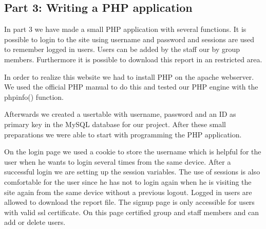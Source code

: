 \subsection {Part 3: Writing a PHP application}


\noindent
In part 3 we have made a small PHP application with several functions. It is possible to login to the site using username and password and sessions are used to remember logged in users. Users can be added by the staff our by group members. Furthermore it is possible to download this report in an restricted area. \newline

\noindent
In order to realize this website we had to install PHP on the apache webserver. We used the official PHP manual to do this \cite{phpinstall}  and tested our PHP engine with the phpinfo() function.\newline

\noindent
Afterwards we created a usertable with username, password and an ID as primary key  in the MySQL database for our project. After these small preparations we were able to start with programming the PHP application.  \newline

\noindent
On the login page we used a cookie to store the username which is helpful for the user when he wants to login several times from the same device. After a successful login we are setting up the session variables. The use of sessions is also comfortable for the user since he has not to login again when he is visiting the site again from the same device without a previous logout. Logged in users  are allowed to download the report file. The signup page is only accessible for users with valid ssl certificate. On this page certified group and staff members and can add or delete users.
\newline
